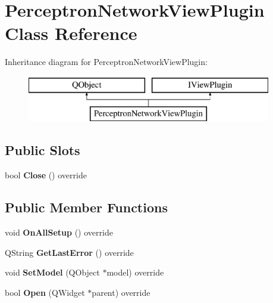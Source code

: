 \hypertarget{class_perceptron_network_view_plugin}{}\section{Perceptron\+Network\+View\+Plugin Class Reference}
\label{class_perceptron_network_view_plugin}
Inheritance diagram for Perceptron\+Network\+View\+Plugin\+:\begin{figure}[H]
\begin{center}
\leavevmode
\includegraphics[height=2.000000cm]{class_perceptron_network_view_plugin}
\end{center}
\end{figure}
\subsection*{Public Slots}
\begin{DoxyCompactItemize}
\item 
\mbox{\label{class_perceptron_network_view_plugin_a0b926a5f59e199142cb3a6bd2fc58e2d}} 
bool {\bfseries Close} () override
\end{DoxyCompactItemize}
\subsection*{Public Member Functions}
\begin{DoxyCompactItemize}
\item 
\mbox{\label{class_perceptron_network_view_plugin_ace8ae52e9cd4093ffc637e5b19a446ff}} 
void {\bfseries On\+All\+Setup} () override
\item 
\mbox{\label{class_perceptron_network_view_plugin_aa4942c85bb0eb6001b23dda5eee1d36b}} 
Q\+String {\bfseries Get\+Last\+Error} () override
\item 
\mbox{\label{class_perceptron_network_view_plugin_af997cf5ec39e674207d48c506f6ac804}} 
void {\bfseries Set\+Model} (Q\+Object $\ast$model) override
\item 
\mbox{\label{class_perceptron_network_view_plugin_a33791a775a8ac09f54a8c35905efe1cd}} 
bool {\bfseries Open} (Q\+Widget $\ast$parent) override
\end{DoxyCompactItemize}


